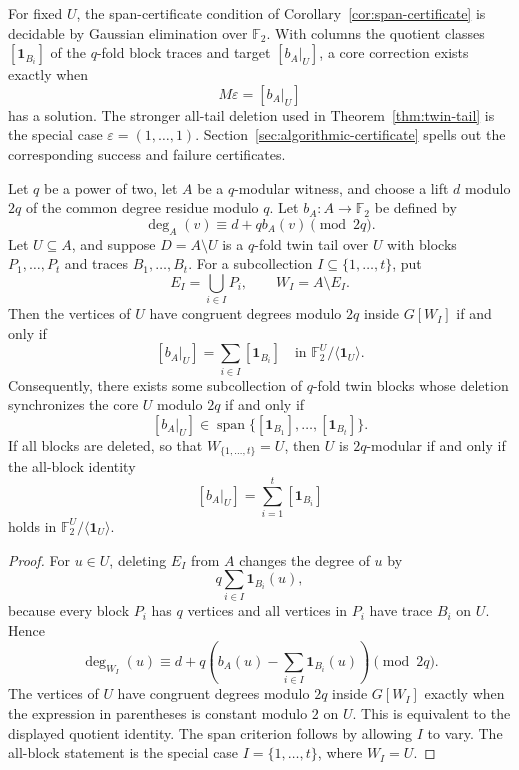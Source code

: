 \documentclass[thmsec,dntnbr,nolinenbrs]{dmgt}
\numberwithin{equation}{section}
\newcommand{\F}{\mathbb{F}}
\newcommand{\one}{\mathbf{1}}
\newcommand{\Span}{\operatorname{span}}
\begin{document}
\begin{corollary}\label{cor:algorithmic-verification}
For fixed \(U\), the span-certificate condition of Corollary~\ref{cor:span-certificate} is decidable by Gaussian elimination over \(\F_2\).  With columns the quotient classes \([\one_{B_i}]\) of the \(q\)-fold block traces and target \([b_A|_U]\), a core correction exists exactly when
\[
        M\varepsilon=[b_A|_U]
\]
has a solution.  The stronger all-tail deletion used in Theorem~\ref{thm:twin-tail} is the special case \(\varepsilon=(1,\ldots,1)\).  Section~\ref{sec:algorithmic-certificate} spells out the corresponding success and failure certificates.
\end{corollary}

\begin{theorem}\label{thm:core-correction}
Let \(q\) be a power of two, let \(A\) be a \(q\)-modular witness, and choose a lift \(d\) modulo \(2q\) of the common degree residue modulo \(q\).  Let \(b_A:A\to\F_2\) be defined by
\[
        \deg_A(v)\equiv d+qb_A(v)\pmod{2q}.
\]
Let \(U\subseteq A\), and suppose \(D=A\setminus U\) is a \(q\)-fold twin tail over \(U\) with blocks \(P_1,\ldots,P_t\) and traces \(B_1,\ldots,B_t\).  For a subcollection \(I\subseteq\{1,\ldots,t\}\), put
\[
        E_I=\bigcup_{i\in I}P_i,
        \qquad
        W_I=A\setminus E_I.
\]
Then the vertices of \(U\) have congruent degrees modulo \(2q\) inside \(G[W_I]\) if and only if
\[
        [b_A|_U]=\sum_{i\in I}[\one_{B_i}]
        \quad\text{in }\F_2^U/\langle \one_U\rangle.
\]
Consequently, there exists some subcollection of \(q\)-fold twin blocks whose deletion synchronizes the core \(U\) modulo \(2q\) if and only if
\[
        [b_A|_U]\in \Span\{[\one_{B_1}],\ldots,[\one_{B_t}]\}.
\]
If all blocks are deleted, so that \(W_{\{1,\ldots,t\}}=U\), then \(U\) is \(2q\)-modular if and only if the all-block identity
\[
        [b_A|_U]=\sum_{i=1}^t[\one_{B_i}]
\]
holds in \(\F_2^U/\langle \one_U\rangle\).
\end{theorem}

\begin{proof}
For \(u\in U\), deleting \(E_I\) from \(A\) changes the degree of \(u\) by
\[
        q\sum_{i\in I}\one_{B_i}(u),
\]
because every block \(P_i\) has \(q\) vertices and all vertices in \(P_i\) have trace \(B_i\) on \(U\).  Hence
\[
        \deg_{W_I}(u)\equiv
        d+q\left(b_A(u)-\sum_{i\in I}\one_{B_i}(u)\right)
        \pmod{2q}.
\]
The vertices of \(U\) have congruent degrees modulo \(2q\) inside \(G[W_I]\) exactly when the expression in parentheses is constant modulo \(2\) on \(U\).  This is equivalent to the displayed quotient identity.  The span criterion follows by allowing \(I\) to vary.  The all-block statement is the special case \(I=\{1,\ldots,t\}\), where \(W_I=U\).
\end{proof}
\end{document}
